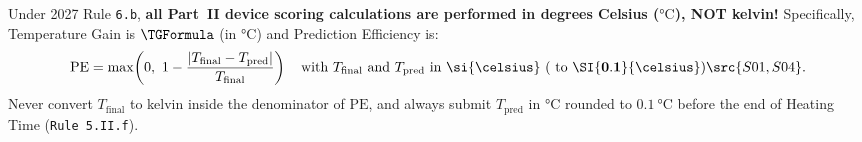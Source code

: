 \begin{devicebox}
Under 2027 Rule \texttt{6.b}, \textbf{all Part~II device scoring calculations are performed in degrees Celsius ($\si{\celsius}$), NOT kelvin!} Specifically, Temperature Gain is $\TGFormula$ (in $\si{\celsius}$) and Prediction Efficiency is:
\[
  \mathrm{PE} = \max\!\left(0,\ 1 - \frac{|T_{\mathrm{final}} - T_{\mathrm{pred}}|}{T_{\mathrm{final}}}\right) \quad \text{with } T_{\mathrm{final}} \text{ and } T_{\mathrm{pred}} \text{ in } \mathbf{\si{\celsius}\text{ ( to }\SI{0.1}{\celsius}\text{)}} \src{S01,S04}.
\]
Never convert $T_{\mathrm{final}}$ to kelvin inside the denominator of $\mathrm{PE}$, and always submit $T_{\mathrm{pred}}$ in $\si{\celsius}$ rounded to $\SI{0.1}{\celsius}$ before the end of Heating Time (\texttt{Rule 5.II.f}).
\end{devicebox}

